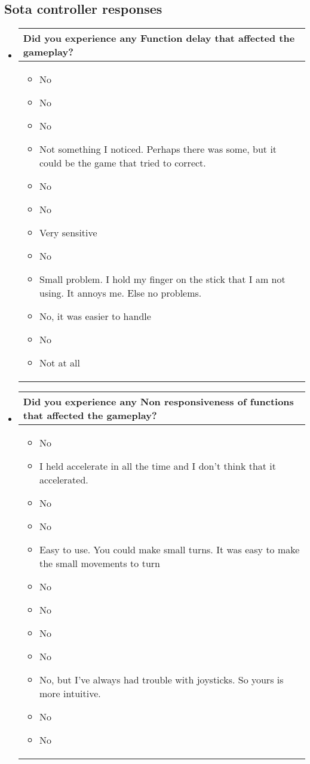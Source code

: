 \subsection{Sota controller responses}
\begin{itemize}

\item[]
\begin{table}[!htb]
\centering
\begin{tabular}{| p{5.5in} |}
\hline
	\cellcolor{NotSkyBlue}\textbf{Did you experience any Function delay that affected the gameplay?}
	\\
	\hline
	\begin{itemize}
        \item No
        \item No
        \item No
        \item Not something I noticed. Perhaps there was some, but it could be the game that tried to correct.
        \item No
        \item No
        \item Very sensitive
        \item No
        \item Small problem. I hold my finger on the stick that I am not using. It annoys me. Else no problems.
        \item No, it was easier to handle
        \item No
        \item Not at all
	\end{itemize}
	\\
	\hline
\end{tabular}
\end{table}

\item[]
\begin{table}[!htb]
\centering
\begin{tabular}{| p{5.5in} |}
\hline
	\cellcolor{NotSkyBlue}\textbf{Did you experience any Non responsiveness of functions that affected the gameplay?}
	\\
	\hline
	\begin{itemize}
        \item No
        \item I held accelerate in all the time and I don’t think that it accelerated.
        \item No
        \item No
        \item Easy to use. You could make small turns. It was easy to make the small movements to turn
        \item No
        \item No
        \item No
        \item No
        \item No, but I’ve always had trouble with joysticks. So yours is more intuitive.
        \item No
        \item No


\end{itemize}
\end{tabular}
\end{table}
\end{itemize}

